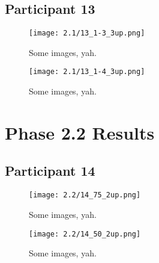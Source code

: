 
\clearpage

\subsection{Participant 13}

\begin{figure}[h]
	\begin{center}
	\texttt{[image: 2.1/13\_1-3\_3up.png]}
	\caption{Some images, yah.}
	\end{center}
\end{figure}

\clearpage

\begin{figure}[h]
	\begin{center}
	\texttt{[image: 2.1/13\_1-4\_3up.png]}
	\caption{Some images, yah.}
	\end{center}
\end{figure}


\clearpage

\section{Phase 2.2 Results}


\clearpage

\subsection{Participant 14}

\begin{figure}[h]
	\begin{center}
	\texttt{[image: 2.2/14\_75\_2up.png]}
	\caption{Some images, yah.}
	\end{center}
\end{figure}

\clearpage

\begin{figure}[h]
	\begin{center}
	\texttt{[image: 2.2/14\_50\_2up.png]}
	\caption{Some images, yah.}
	\end{center}
\end{figure}

